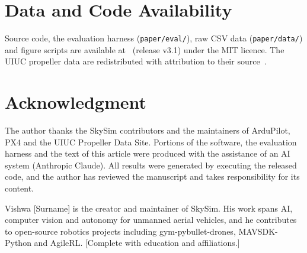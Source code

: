 \documentclass{ieeeaccess}
\begin{document}
\section*{Data and Code Availability}
Source code, the evaluation harness (\texttt{paper/eval/}), raw CSV data
(\texttt{paper/data/}) and figure scripts are available
at~\cite{skysimrepo} (release v3.1) under the MIT licence. The UIUC propeller data are
redistributed with attribution to their source~\cite{uiucpropdb}.

\section*{Acknowledgment}
The author thanks the SkySim contributors and the maintainers of ArduPilot,
PX4 and the UIUC Propeller Data Site. Portions of the software, the evaluation
harness and the text of this article were produced with the assistance of an AI
system (Anthropic Claude). All results were generated by executing the released
code, and the author has reviewed the manuscript and takes responsibility for
its content.




\begin{IEEEbiography}{Vishwa [Surname]}
is the creator and maintainer of SkySim. His work spans AI, computer vision
and autonomy for unmanned aerial vehicles, and he contributes to open-source
robotics projects including gym-pybullet-drones, MAVSDK-Python and AgileRL.
[Complete with education and affiliations.]
\end{IEEEbiography}

\EOD
\end{document}
